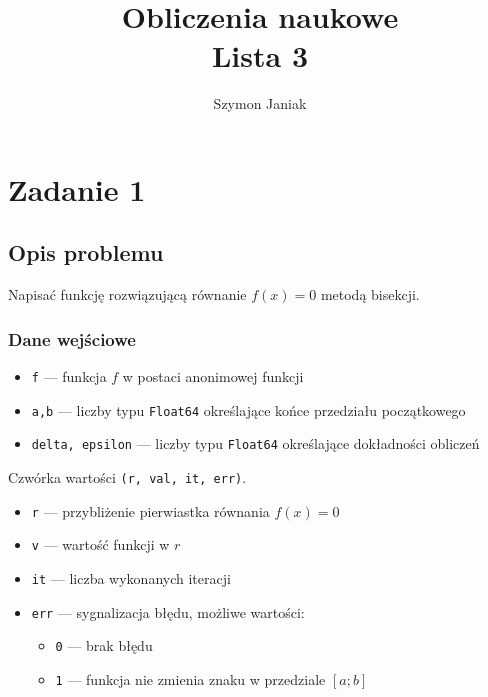 \documentclass{article}
\title{%
	Obliczenia naukowe \\
	\large Lista 3}
\author{Szymon Janiak}
\begin{document}
\maketitle

\section*{Zadanie 1}
\subsection*{Opis problemu}
	Napisać funkcję rozwiązującą równanie $f(x) = 0$ metodą bisekcji.
\subsubsection*{Dane wejściowe}
	\begin{itemize}
	    \item \texttt{f} — funkcja $f$ w postaci anonimowej funkcji
	    \item \texttt{a,b} — liczby typu \texttt{Float64} określające końce przedziału początkowego
	    \item \texttt{delta, epsilon} — liczby typu \texttt{Float64} określające dokładności obliczeń
	\end{itemize}
	Czwórka wartości \texttt{(r, val, it, err)}.
	\begin{itemize}
	    \item \texttt{r} — przybliżenie pierwiastka równania $f(x) = 0$
	    \item \texttt{v} — wartość funkcji w $r$
	    \item \texttt{it} — liczba wykonanych iteracji
	    \item \texttt{err} — sygnalizacja błędu, możliwe wartości:
	    \begin{itemize}
	        \item \texttt{0} — brak błędu
	        \item \texttt{1} — funkcja nie zmienia znaku w przedziale $[a;b]$
	    \end{itemize}
	\end{itemize}
\end{document}
